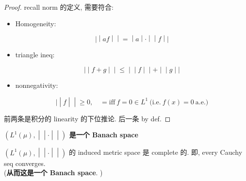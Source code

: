\documentclass{qlnotes-export}
\begin{document}
\begin{proof}

recall norm 的定义, 需要符合:

\begin{itemize}
\item
  Homogeneity:

  \[\left. | \middle| af \middle| \middle| = \middle| a \middle| \cdot \middle| \middle| f \middle| | \right.\]
\item
  triangle ineq:

  \[\left. | \middle| f + g \middle| \middle| \leq \middle| \middle| f \middle| \middle| + \middle| \middle| g \middle| | \right.\]
\item
  nonnegativity:

  \[\left. | \middle| f \middle| \middle| \geq 0,\quad = \text{iff}\ f = 0 \in L^{1}\ \text{(i.e.}\ f(x) = 0\ \text{a.e.)} \right.\]
\end{itemize}

前两条是积分的 linearity 的下位推论. 后一条 by def.

\end{proof}

\begin{corollary}{\protect{}\label{kn-l-1-mu-cdot-banach-space}{\textbf{\(\left. (L^{1}(\mu), \middle| \middle| \cdot \middle| \middle| ) \right.\)
是一个 Banach space}}}

\(\left. (L^{1}(\mu), \middle| \middle| \cdot \middle| \middle| ) \right.\) 的 induced metric space 是 complete 的. 即, every Cauchy seq converges.\\
(\textbf{从而这是一个 Banach space}. )

\end{corollary}
\end{document}
